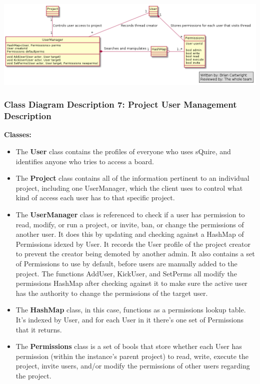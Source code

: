 \documentclass[twoside,letterpaper]{article}
\begin{document}
	\includegraphics[width=6.0in]{images/ClassDiagrams/ProjectUserManagement}
	
	\newpage
	
	\subsubsection[Class Diagram Description 7: Project User Management Description]{\rmfamily\bfseries\color{black}
		Class Diagram Description 7: Project User Management Description}
	\hypertarget{RefHeading22059017292}{}
	
	\textbf{Classes:}
	\begin{itemize}
	
		\item The \textbf{User} class contains the profiles of everyone who uses sQuire, and identifies anyone who tries to access a board.
		\item The \textbf{Project} class contains all of the information pertinent to an individual project, including one UserManager, which the client uses to control what kind of access each user has to that specific project.
		\item The \textbf{UserManager} class is referenced to check if a user has permission to read, modify, or run a project, or invite, ban, or change the permissions of another user. It does this by updating and checking against a HashMap of Permissions idexed by User. It records the User profile of the project creator to prevent the creator being demoted by another admin. It also contains a set of Permissions to use by default, before users are manually added to the project.
		The functions AddUser, KickUser, and SetPerms all modify the permissions HashMap after checking against it to make sure the active user has the authority to change the permissions of the target user.
		\item The \textbf{HashMap} class, in this case, functions as a permissions lookup table. It's indexed by User, and for each User in it there's one set of Permissions that it returns.
		\item The \textbf{Permissions} class is a set of bools that store whether each User has permission (within the instance's parent project) to read, write, execute the project, invite users, and/or modify the permissions of other users regarding the project.
	\end{itemize}
	
\end{document}
